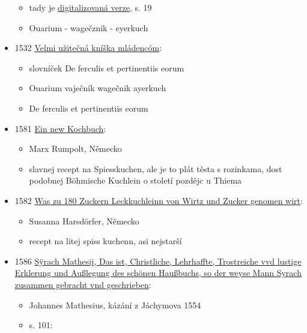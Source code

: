 \begin{itemize}
  \begin{itemize}
  \tightlist
  \item
    tady je
    \href{https://dbc.wroc.pl/dlibra/publication/33643/edition/30385/content?ref=L3B1YmxpY2F0aW9uLzM0Njg5L2VkaXRpb24vMzE0MTQ}{digitalizovaná
    verze}, s. 19
  \item
    Ouarium - wagečznik - eyerkuch
  \end{itemize}
\item
  1532
  \href{https://bara.ujc.cas.cz/slovniky/slovknm/slovknm31.html\#CTX1129}{Velmi
  užitečná kníška mládencóm}:

  \begin{itemize}
  \tightlist
  \item
    slovníček De ferculis et pertinentiis eorum
  \item
    Ouarium \textbar{} vaječník \textbar{} wagečnik \textbar{} ayerkuch
  \item
    De ferculis et pertinentiis eorum
  \end{itemize}
\item
  1581 \href{https://cakes.institute/rumpolt.html}{Ein new Kochbuch}:

  \begin{itemize}
  \tightlist
  \item
    Marx Rumpolt, Německo
  \item
    slavnej recept na Spiesskuchen, ale je to plát těsta s rozinkama,
    dost podobnej Böhmische Kuchlein o století pozdějc u Thiema
  \end{itemize}
\item
  1582 \href{https://cakes.institute/harsdorfer.html}{Was zu 180 Zuckern
  Leckkuchleinn von Wirtz und Zucker genomen wirt}:

  \begin{itemize}
  \tightlist
  \item
    Susanna Harsdörfer, Německo
  \item
    recept na litej spiss kuchenn, asi nejstarší
  \end{itemize}
\item
  1586
  \href{https://books.google.cz/books?id=wN9YAAAAcAAJ&vq=ayerkuch&hl=cs&pg=PA101-IA1\#v=onepage&q&f=false}{Sÿrach
  Mathesij, Das ist, Christliche, Lehrhaffte, Trostreiche vvd lustige
  Erklerung und Außlegung des schönen Haußbuchs, so der weyse Mann
  Syrach zusammen gebracht vnd geschrieben}:

  \begin{itemize}
  \tightlist
  \item
    Johannes Mathesius, kázání z Jáchymova 1554
  \item
    s. 101:


\end{itemize}
\end{itemize}
